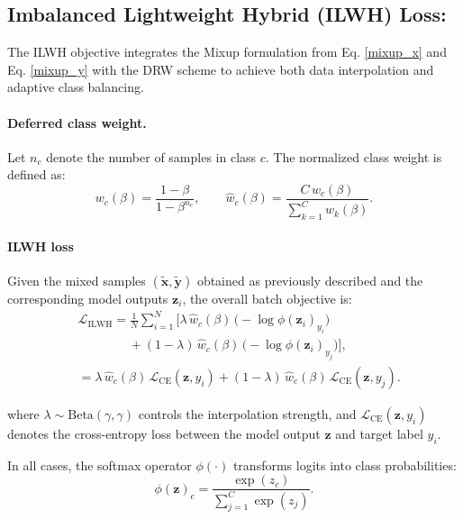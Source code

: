 \subsection{Imbalanced Lightweight Hybrid (ILWH) Loss:}
The ILWH objective integrates the Mixup formulation from Eq. \eqref{mixup_x} and 
Eq. \eqref{mixup_y} with the DRW scheme to achieve both data interpolation and adaptive class balancing.

\paragraph{Deferred class weight.}
Let $n_c$ denote the number of samples in class $c$. The normalized class weight is defined as:
\begin{equation}
w_c(\beta) = \frac{1 - \beta}{1 - \beta^{n_c}}, \qquad
\hat{w}_c(\beta) = \frac{C \, w_c(\beta)}{\sum_{k=1}^{C} w_k(\beta)}.
\end{equation}

\paragraph{ILWH loss}
Given the mixed samples $(\tilde{\mathbf{x}}, \tilde{\mathbf{y}})$ obtained as previously described and the corresponding model outputs $\mathbf{z}_i$, the overall batch objective is:
\begin{align}
&\mathcal{L}_{\mathrm{ILWH}}
= \frac{1}{N} \sum_{i=1}^{N}
\Big[
    \lambda \, \hat{w}_{c}(\beta) \,
        \big(-\log \phi(\mathbf{z}_i)_{y_i}\big) \nonumber \\ 
        &\quad \quad \quad \quad + (1 - \lambda) \,
        \hat{w}_{c}(\beta) \,
        \big(-\log \phi(\mathbf{z}_i)_{y_j}\big)
\Big], \\
&=\lambda \, \hat{w}_{c}(\beta) \,\mathcal{L}_{\mathrm{CE}}(\mathbf{z}, y_i) + (1 - \lambda) \, \hat{w}_{c}(\beta) \,\mathcal{L}_{\mathrm{CE}}(\mathbf{z}, y_j).
\end{align}

where $\lambda \sim \mathrm{Beta}(\gamma, \gamma)$ controls the interpolation strength, 
and $\mathcal{L}_{\mathrm{CE}}(\mathbf{z}, y_i)$ denotes the cross-entropy loss 
between the model output $\mathbf{z}$ and target label $y_i$.  

\vspace{0.5em}
\noindent
In all cases, the softmax operator $\phi(\cdot)$ transforms logits into class probabilities:
\begin{equation}
\phi(\mathbf{z})_c = \frac{\exp(z_c)}{\sum_{j=1}^{C} \exp(z_j)}.
\end{equation}

